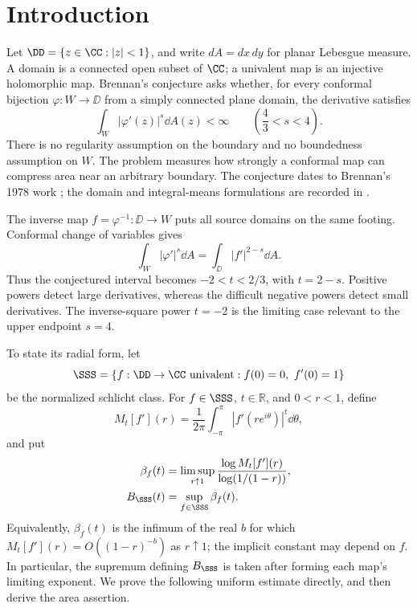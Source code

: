 \begin{abstract}
We prove Brennan's conjecture: if a simply connected plane domain admits a
conformal bijection $\varphi$ onto the unit disk, then $|\varphi'|^s$ is
area-integrable for every $4/3<s<4$. We also prove the sharp inverse-square
integral-means exponent $B_{\SSS}(-2)=1$ for the normalized schlicht class
$\SSS$.
\end{abstract}

\section{Introduction}
\label{sec:introduction}

Let $\DD=\{z\in\CC:|z|<1\}$, and write $dA=dx\,dy$ for planar
Lebesgue measure. A domain is a connected open subset of $\CC$; a
univalent map is an injective holomorphic map. Brennan's conjecture asks
whether, for every conformal bijection $\varphi:W\to\DD$ from a simply
connected plane domain, the derivative satisfies
\[
 \int_W|\varphi'(z)|^s\dd A(z)<\infty
 \qquad\left(\frac43<s<4\right).
\]
There is no regularity assumption on the boundary and no boundedness
assumption on $W$. The problem measures how strongly a conformal map can
compress area near an arbitrary boundary. The conjecture dates to
Brennan's 1978 work \cite{Brennan1978}; the domain and integral-means
formulations are recorded in \cite[Chapter~3]{Bertilsson1999}.

The inverse map $f=\varphi^{-1}:\DD\to W$ puts all source domains on
the same footing. Conformal change of variables gives
\begin{equation}\label{eq:inverse-area}
 \int_W|\varphi'|^s\dd A
 =\int_{\DD}|f'|^{2-s}\dd A.
\end{equation}
Thus the conjectured interval becomes $-2<t<2/3$, with $t=2-s$.
Positive powers detect large derivatives, whereas the difficult negative
powers detect small derivatives. The inverse-square power $t=-2$ is
the limiting case relevant to the upper endpoint $s=4$.

To state its radial form, let
\[
 \SSS=\{f:\DD\to\CC\text{ univalent}:f(0)=0,\ f'(0)=1\}
\]
be the normalized schlicht class. For $f\in\SSS$, $t\in\mathbb R$,
and $0<r<1$, define
\[
 M_t[f'](r)=\frac1{2\pi}\int_{-\pi}^{\pi}
                  |f'(re^{i\theta})|^t\dd\theta,
\]
and put
\begin{align*}
 \beta_f(t)&=\limsup_{r\uparrow1}
       \frac{\log M_t[f'](r)}{\log(1/(1-r))},\\
 B_{\SSS}(t)&=\sup_{f\in\SSS}\beta_f(t).
\end{align*}
Equivalently, $\beta_f(t)$ is the infimum of the real $b$ for which
$M_t[f'](r)=O((1-r)^{-b})$ as $r\uparrow1$; the implicit constant may
depend on $f$. In particular, the supremum defining $B_{\SSS}$ is taken after forming
each map's limiting exponent. We prove the following uniform estimate
directly, and then derive the area assertion.

